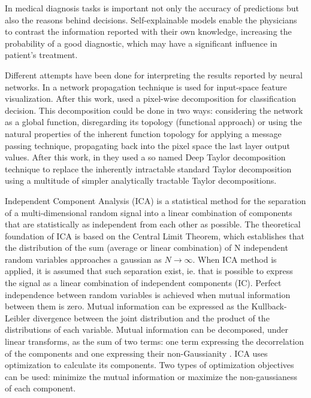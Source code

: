 \documentclass[preprint]{elsarticle}
\theoremstyle{definition} %
\theoremstyle{remark}
\begin{document}
In medical diagnosis tasks is important not only the accuracy of predictions but also the reasons behind decisions. Self-explainable models enable the physicians to contrast the information reported with their own knowledge, increasing the probability of a good diagnostic, which may have a significant influence in patient's treatment.  

Different attempts have been done for interpreting the results reported by neural networks. In \citep{zeiler2014visualizing} a network propagation technique is used for input-space feature visualization. After this work, \citep{bach2015pixel} used a pixel-wise decomposition for classification decision. This decomposition could be done in two ways: considering the network as a global function, disregarding its topology (functional approach) or using the natural properties of the inherent function topology for applying a message passing technique, propagating back into the pixel space the last layer output values. After this work, in \citep{montavon2017explaining} they used a so named Deep Taylor decomposition technique to replace the inherently intractable standard Taylor decomposition using a multitude of simpler analytically tractable Taylor decompositions.

Independent Component Analysis (ICA)\citep{hyvarinen2000independent} is a statistical method for the separation of a multi-dimensional random signal into a linear combination of components that are statistically as independent from each other as possible. The theoretical foundation of ICA is based on the Central Limit Theorem, which establishes that the distribution of the sum (average or linear combination) of N independent random variables approaches a gaussian as $N \rightarrow \infty$. When ICA method is applied, it is assumed that such separation exist, ie. that is possible to express the signal as a linear combination of independent components (IC). Perfect independence between random variables is achieved when mutual information between them is zero. Mutual information can be expressed as the Kullback-Leibler divergence between the joint distribution and the product of the distributions of each variable. Mutual information can be decomposed, under linear transforms, as the sum of two terms: one term expressing the decorrelation of the components and one expressing their non-Gaussianity \citep{cardoso2003dependence}. ICA uses optimization to calculate its components. Two types of optimization objectives can be used: minimize the mutual information or maximize the non-gaussianess of each component. 
\end{document}
